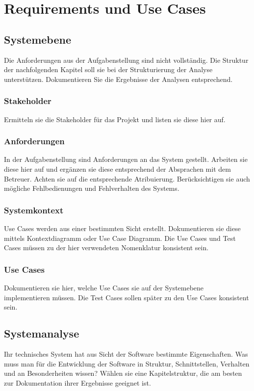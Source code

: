 \chapter{Requirements und Use Cases}

\section{Systemebene}

Die Anforderungen aus der Aufgabenstellung sind nicht vollständig. Die
Struktur der nachfolgenden Kapitel soll sie bei der Strukturierung der
Analyse unterstützen. Dokumentieren Sie die Ergebnisse der Analysen
entsprechend.

\subsection{Stakeholder}

Ermitteln sie die Stakeholder für das Projekt und listen sie diese hier
auf.

\subsection{Anforderungen}

In der Aufgabenstellung sind Anforderungen an das System gestellt.
Arbeiten sie diese hier auf und ergänzen sie diese entsprechend der
Absprachen mit dem Betreuer. Achten sie auf die entsprechende
Atribuierung. 
Berücksichtigen sie auch mögliche Fehlbedienungen und Fehlverhalten des
Systems.

\subsection{Systemkontext}

Use Cases werden aus einer bestimmten Sicht erstellt. Dokumentieren sie
diese mittels Kontextdiagramm oder Use Case Diagramm. Die Use Cases und
Test Cases müssen zu der hier verwendeten Nomenklatur konsistent sein.

\subsection{Use Cases}

Dokumentieren sie hier, welche Use Cases sie auf der Systemebene
implementieren müssen. Die Test Cases sollen später zu den Use Cases
konsistent sein.

\section{Systemanalyse}
Ihr technisches System hat aus Sicht der Software bestimmte
Eigenschaften. Was muss man für die Entwicklung der Software in
Struktur, Schnittstellen, Verhalten und an Besonderheiten wissen? Wählen
sie eine Kapitelstruktur, die am besten zur Dokumentation ihrer
Ergebnisse geeignet ist.

